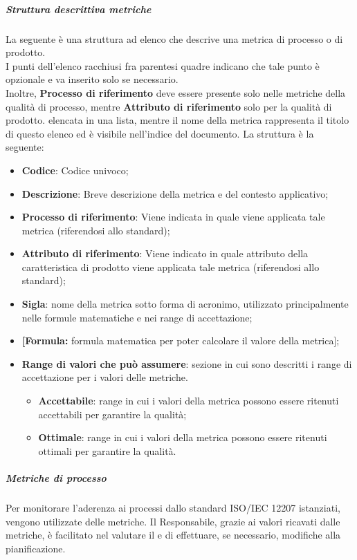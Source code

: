 \subparagraph*{Struttura descrittiva metriche}
La seguente è una struttura ad elenco che descrive una metrica di processo o di prodotto. \\
I punti dell'elenco racchiusi fra parentesi quadre indicano che tale punto è opzionale e va inserito solo se necessario.\\
Inoltre, \textbf{Processo di riferimento} deve essere presente solo nelle metriche della qualità di processo, mentre \textbf{Attributo di riferimento} solo per la qualità di prodotto.
elencata in una lista, mentre il nome della metrica rappresenta il titolo di questo elenco ed è visibile nell'indice del documento. La struttura è la seguente:
\begin{itemize}
    \item \textbf{Codice}: Codice univoco;
    \item \textbf{Descrizione}: Breve descrizione della metrica e del contesto applicativo;
    \item \textbf{Processo di riferimento}: Viene indicata in quale  viene applicata tale metrica (riferendosi allo standard);
    \item \textbf{Attributo di riferimento}: Viene indicato in quale attributo della caratteristica di prodotto viene applicata tale metrica (riferendosi allo standard);
    \item \textbf{Sigla}: nome della metrica sotto forma di acronimo, utilizzato principalmente nelle formule matematiche e nei range di accettazione;
    \item \textbf{[Formula:} formula matematica per poter calcolare il valore della metrica];
    \item \textbf{Range di valori che può assumere}: sezione in cui sono descritti i range di accettazione per i valori delle metriche.
    \begin{itemize}
        \item \textbf{Accettabile}: range in cui i valori della metrica possono essere ritenuti accettabili per garantire la qualità;
        \item \textbf{Ottimale}: range in cui i valori della metrica possono essere ritenuti ottimali per garantire la qualità.
    \end{itemize}
\end{itemize}

\subparagraph*{Metriche di processo}
Per monitorare l'aderenza ai processi dallo standard ISO/IEC 12207 istanziati, vengono utilizzate delle metriche. Il Responsabile, grazie ai valori ricavati dalle metriche, è facilitato nel valutare il  e di effettuare, se necessario, modifiche alla pianificazione.

